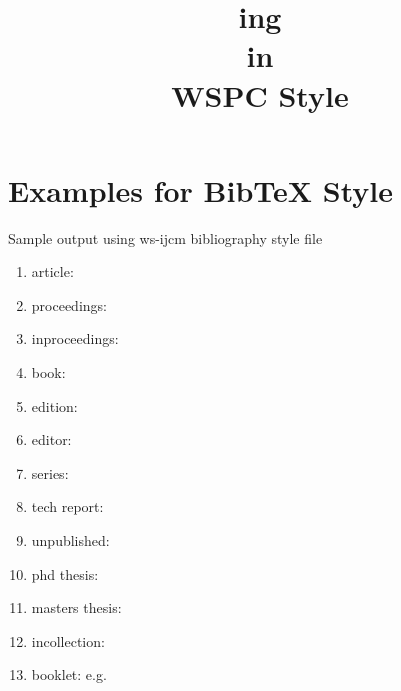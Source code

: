 \documentclass{ws-ijcm}
\begin{document}
\title{\btex ing\\[.5ex] in \\[.5ex] WSPC \bib\/ Style}


\maketitle

\section{Examples for BibTeX Style}
Sample output using ws-ijcm bibliography style file

\begin{enumerate}[13]

\item article: \cite{best,pier,jame,Ko05}

\item proceedings: \cite{weis94}

\item inproceedings: \cite{conftypical,Moss94}

\item book: \cite{ArmsRace1,NR92}

\item edition: \cite{ComplexVariables}

\item editor: \cite{ColBenh:93}

\item series: \cite{inbook}

\item tech report: \cite{hobby1992,CSTR116}

\item unpublished: \cite{VoQS}

\item phd thesis: \cite{Brown:1988:IEL}

\item masters thesis: \cite{segms}

\item incollection: \cite{Jones:Phoneme}

\item booklet: e.g. \citet{URW:kerning}

\end{enumerate}



\end{document}
